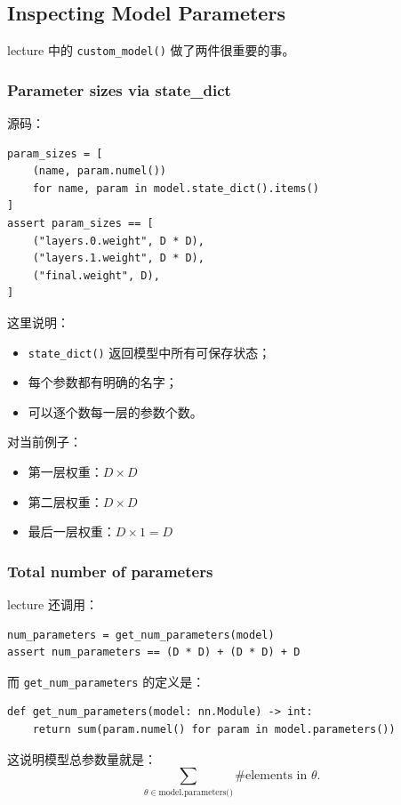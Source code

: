 \documentclass[a4paper,UTF8]{article}
\numberwithin{equation}{section}
\begin{document}
\subsection{Inspecting Model Parameters}

lecture 中的 \verb|custom_model()| 做了两件很重要的事。

\subsubsection{Parameter sizes via state\_dict}

源码：
\begin{verbatim}
param_sizes = [
    (name, param.numel())
    for name, param in model.state_dict().items()
]
assert param_sizes == [
    ("layers.0.weight", D * D),
    ("layers.1.weight", D * D),
    ("final.weight", D),
]
\end{verbatim}

这里说明：
\begin{itemize}
    \item \verb|state_dict()| 返回模型中所有可保存状态；
    \item 每个参数都有明确的名字；
    \item 可以逐个数每一层的参数个数。
\end{itemize}

对当前例子：
\begin{itemize}
    \item 第一层权重：\(D \times D\)
    \item 第二层权重：\(D \times D\)
    \item 最后一层权重：\(D \times 1 = D\)
\end{itemize}

\subsubsection{Total number of parameters}

lecture 还调用：
\begin{verbatim}
num_parameters = get_num_parameters(model)
assert num_parameters == (D * D) + (D * D) + D
\end{verbatim}

而 \verb|get_num_parameters| 的定义是：
\begin{verbatim}
def get_num_parameters(model: nn.Module) -> int:
    return sum(param.numel() for param in model.parameters())
\end{verbatim}

这说明模型总参数量就是：
\[
\sum_{\theta \in \text{model.parameters()}} \#\text{elements in } \theta.
\]
\end{document}
